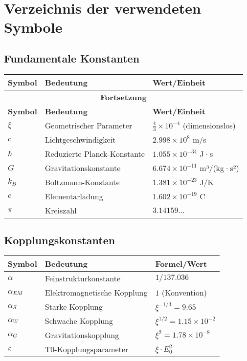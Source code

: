 \documentclass[12pt,a4paper]{article}
\begin{document}
	\appendix
	
	\section{Verzeichnis der verwendeten Symbole}
	
	\subsection{Fundamentale Konstanten}
	
	\begin{longtable}{lll}
		\toprule
		\textbf{Symbol} & \textbf{Bedeutung} & \textbf{Wert/Einheit} \\
		\midrule
		\endfirsthead
		\multicolumn{3}{c}{{\bfseries Fortsetzung}} \\
		\toprule
		\textbf{Symbol} & \textbf{Bedeutung} & \textbf{Wert/Einheit} \\
		\midrule
		\endhead
		\bottomrule
		\endfoot
		\bottomrule
		\endlastfoot
		
		$\xi$ & Geometrischer Parameter & $\frac{4}{3} \times 10^{-4}$ (dimensionslos) \\
		$c$ & Lichtgeschwindigkeit & $2.998 \times 10^8$ m/s \\
		$\hbar$ & Reduzierte Planck-Konstante & $1.055 \times 10^{-34}$ J·s \\
		$G$ & Gravitationskonstante & $6.674 \times 10^{-11}$ m³/(kg·s²) \\
		$k_B$ & Boltzmann-Konstante & $1.381 \times 10^{-23}$ J/K \\
		$e$ & Elementarladung & $1.602 \times 10^{-19}$ C \\
		$\pi$ & Kreiszahl & $3.14159...$ \\
	\end{longtable}
	
	\subsection{Kopplungskonstanten}
	
	\begin{longtable}{lll}
		\toprule
		\textbf{Symbol} & \textbf{Bedeutung} & \textbf{Formel/Wert} \\
		\midrule
		$\alpha$ & Feinstrukturkonstante & $1/137.036$ \\
		$\alpha_{EM}$ & Elektromagnetische Kopplung & $1$ (Konvention) \\
		$\alpha_S$ & Starke Kopplung & $\xi^{-1/3} = 9.65$ \\
		$\alpha_W$ & Schwache Kopplung & $\xi^{1/2} = 1.15 \times 10^{-2}$ \\
		$\alpha_G$ & Gravitationskopplung & $\xi^{2} = 1.78 \times 10^{-8}$ \\
		$\varepsilon$ & T0-Kopplungsparameter & $\xi \cdot E_0^2$ \\
		\bottomrule
	\end{longtable}
	
\end{document}
